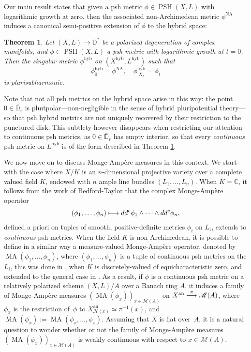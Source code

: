 \documentclass[JEP,XML,SOM,Unicode,published]{cedram}
\newcommand\mto{\mathchoice{\longmapsto}{\mapsto}{\mapsto}{\mapsto}}
\newcommand{\To}[1]{\mathchoice{\xrightarrow{\textstyle\kern4pt#1\kern3pt}}{\stackrel{#1}{\longrightarrow}}{}{}}
\newtheorem{thmA}{Theorem}
\theoremstyle{definition}
\newcommand \C{\mathbb C}
\newcommand \D {\mathbb{D}}
\newcommand \M {\mathscr {M}}
\newcommand{\an}{\mathrm{an}}
\newcommand{\hyb}{\mathrm{hyb}}
\DeclareMathOperator{\MA}{MA}
\DeclareMathOperator{\NA}{NA}
\DeclareMathOperator{\PSH}{PSH}
\begin{document}
Our main result states that given a psh metric $\phi \in \PSH(X, L)$ with logarithmic growth at zero, then the associated non-Archimedean metric $\phi^{\NA}$ induces a canonical semi-positive extension of $\phi$ to the hybrid space:
\begin{thmA}\label{th:A} Let $(X, L) \to \D^*$ be a polarized degeneration of complex manifolds, and $\phi \in \PSH(X, L)$ a psh metric with logarithmic growth at $t=0$. Then the singular metric $\phi^{\hyb}$ on $(X^{\hyb}, L^{\hyb})$ such that
\[
\phi^{\hyb}_0 = \phi^{\NA},\quad\phi^{\hyb}_{| X_t} = \phi_t
\]
is plurisubharmonic.
\end{thmA}
Note that not all psh metrics on the hybrid space arise in this way: the point $0 \in \bar{\D}_r$ is pluripolar---non-negligible in the sense of hybrid pluripotential theory---so that psh hybrid metrics are not uniquely recovered by their restriction to the punctured disk. This subtlety however disappears when restricting our attention to continuous psh metrics, as $0 \in \bar{\D}_r$ has empty interior, so that every \emph{continuous} psh metric on $L^{\hyb}$ is of the form described in Theorem \ref{th:A}.

We now move on to discuss Monge-Ampère measures in this context. We start with the case where $X/K$ is an $n$-dimensional projective variety over a complete valued field $K$, endowed with $n$ ample line bundles $(L_1,\dots,L_n)$. When $K = \C$, it follows from the work of Bedford-Taylor \cite{BT} that the complex Monge-Ampère operator\vspace*{-3pt}
\[
(\phi_1,\dots, \phi_n) \mto dd^c \phi_1 \wedge\cdots  \wedge dd^c \phi_n,
\]
defined a priori on tuples of smooth, positive-definite metrics $\phi_i$ on $L_i$, extends to \emph{continuous} psh metrics. When the field $K$ is non-Archimedean, it is possible to define in a similar way a measure-valued Monge-Ampère operator, denoted by $\MA(\phi_1,\dots,\phi_n)$, where $(\phi_1,\dots,\phi_n)$ is a tuple of continuous psh metrics on the $L_i$, this was done in \cite{CL}, \cite{BFJ1} when $K$ is discretely-valued of equicharacteristic zero, and extended to the general case in \cite{BE}. As a result, if $\phi$ is a continuous psh metric on a relatively polarized scheme $(X,L)/A$ over a Banach ring $A$, it induces a family of Monge-Ampère measures $(\MA(\phi_x))_{x \in \M(A)}$ on $X^{\an} \To{\pi} \M(A)$, where $\phi_x$ is the restriction of~$\phi$ to $X^{\an}_{\mathscr{H}(x)} \simeq \pi^{-1}(x)$, and $\MA(\phi_x):= \MA(\phi_x,\dots, \phi_x)$. Assuming that $X$ is flat over~$A$, it is a natural question to wonder whether or not the family of Monge-Ampère measures $(\MA(\phi_x))_{x \in \M(A)}$ is weakly continuous with respect to $x \in \M(A)$.
\end{document}
